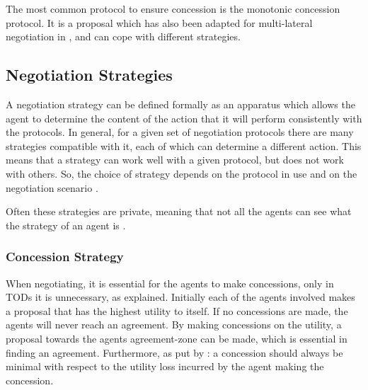 The most common protocol to ensure concession is the monotonic concession protocol. It is a proposal which has also been adapted for multi-lateral negotiation in \citep{endriss2006monotonic}, and can cope with different strategies.

\subsection{Negotiation Strategies}
A negotiation strategy can be defined formally as an apparatus which allows the agent to determine the content of the action that it will perform consistently with the protocols. In general, for a given set of negotiation protocols there are many strategies compatible with it, each of which can determine a different action. This means that a strategy can work well with a given protocol, but does not work with others. So, the choice of strategy depends on the protocol in use and on the negotiation scenario \citep{di2015multi}.

Often these strategies are private, meaning that not all the agents can see what the strategy of an agent is \citep{fatima2004agenda}. 

\subsubsection{Concession Strategy}
\label{sec:concessionstrat}
When negotiating, it is essential for the agents to make concessions, only in TODs it is unnecessary, as explained. Initially each of the agents involved makes a proposal that has the highest utility to itself. If no concessions are made, the agents will never reach an agreement. By making concessions on the utility, a proposal towards the agents agreement-zone can be made, which is essential in finding an agreement. Furthermore, as put by \citet{endriss2006monotonic}: a concession should always be minimal with respect to the utility loss incurred by the agent making the concession.


